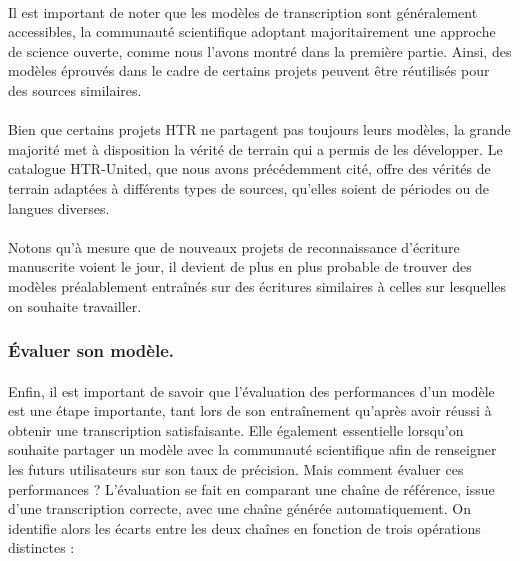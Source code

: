 \documentclass[a4paper,12pt,twoside]{book}
\begin{document}
\paragraph{}
Il est important de noter que les modèles de transcription sont généralement accessibles, la communauté scientifique adoptant majoritairement une approche de science ouverte, comme nous l'avons montré dans la première partie. Ainsi, des modèles éprouvés dans le cadre de certains projets peuvent être réutilisés pour des sources similaires.

\paragraph{}
Bien que certains projets HTR ne partagent pas toujours leurs modèles, la grande majorité met à disposition la vérité de terrain qui a permis de les développer. Le catalogue HTR-United, que nous avons précédemment cité, offre des vérités de terrain adaptées à différents types de sources, qu'elles soient de périodes ou de langues diverses.

\paragraph{}
 Notons qu'à mesure que de nouveaux projets de reconnaissance d'écriture manuscrite voient le jour, il devient de plus en plus probable de trouver des modèles préalablement entraînés sur des écritures similaires à celles sur lesquelles on souhaite travailler.

\subsubsection{Évaluer son modèle.}

\paragraph{}
Enfin, il est important de savoir que l’évaluation des performances d’un modèle est une étape importante, tant lors de son entraînement qu'après avoir réussi à obtenir une transcription satisfaisante. Elle également essentielle  lorsqu’on souhaite partager un modèle avec la communauté scientifique afin de renseigner les futurs utilisateurs sur son taux de précision. Mais comment évaluer ces performances ? L'évaluation se fait en comparant une chaîne de référence, issue d'une transcription correcte, avec une chaîne générée automatiquement. On identifie alors les écarts entre les deux chaînes en fonction de trois opérations distinctes :
\end{document}
